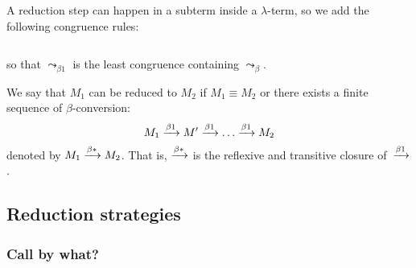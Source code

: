 \begin{definition}
  A reduction step can happen in a subterm inside a $\lambda$-term, so
  we add the following congruence rules:
  \begin{columns}
    \begin{prooftree}
    \end{prooftree}
    \begin{prooftree}
    \end{prooftree}
  \end{columns}
  \begin{columns}
    \begin{prooftree}
    \end{prooftree}
    \begin{prooftree}
    \end{prooftree}
  \end{columns}
  so that $\leadsto_{\beta1}$ is the least congruence containing $\leadsto_\beta$.
\end{definition}
\begin{definition}
  We say that $M_1$ can be reduced to $M_2$
  if $M_1 \equiv M_2$ or there exists a finite sequence of $\beta$-conversion:
  \[
    M_1 \onereduce M' \onereduce \dots \onereduce M_2
  \]
  denoted by $M_1 \reduce M_2$. That is, $\reduce$ is the
  reflexive and transitive closure of~$\onereduce$.
\end{definition}
\subsection{Reduction strategies}
\subsubsection*{Call by what?}
